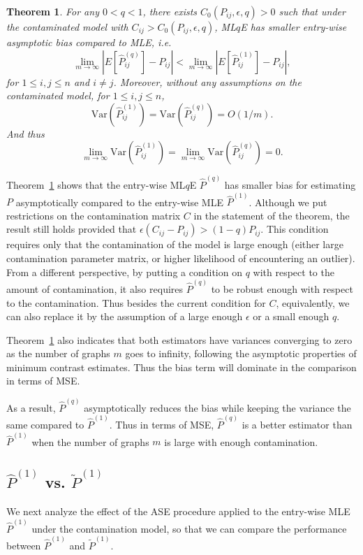 \documentclass[a4paper]{article}
\newtheorem{theorem}[fact]{Theorem}
\renewcommand{\hat}{\widehat}
\begin{document}
\begin{theorem}
\label{thm:MLEvsMLqE}
For any $0 < q < 1$, there exists $C_0(P_{ij}, \epsilon, q) > 0$ such that under the contaminated model with $C_{ij} > C_0(P_{ij}, \epsilon, q)$, ML$q$E has smaller entry-wise asymptotic bias compared to MLE, i.e.\
\[
	\lim_{m \to \infty} \left| E[\hat{P}^{(q)}_{ij}] - P_{ij} \right| < 
    \lim_{m \to \infty} \left| E[\hat{P}^{(1)}_{ij}] - P_{ij} \right|,
\]
for $1 \le i, j \le n$ and $i \ne j$.
Moreover, without any assumptions on the contaminated model, for $1 \le i, j \le n$, 
\[
	\mathrm{Var}(\hat{P}^{(1)}_{ij})
    = \mathrm{Var}(\hat{P}^{(q)}_{ij}) = O(1/m).
\]
And thus
\[
	\lim_{m \to \infty} \mathrm{Var}(\hat{P}^{(1)}_{ij})
    = \lim_{m \to \infty} \mathrm{Var}(\hat{P}^{(q)}_{ij}) = 0.
\]
\end{theorem}

Theorem~\ref{thm:MLEvsMLqE} shows that the entry-wise ML$q$E $\hat{P}^{(q)}$ has smaller bias for estimating $P$ asymptotically compared to the entry-wise MLE $\hat{P}^{(1)}$. Although we put restrictions on the contamination matrix $C$ in the statement of the theorem, the result still holds provided that $\epsilon (C_{ij} - P_{ij}) > (1 - q) P_{ij}$. This condition requires only that the contamination of the model is large enough (either large contamination parameter matrix, or higher likelihood of encountering an outlier). From a different perspective, by putting a condition on $q$ with respect to the amount of contamination, it also requires $\hat{P}^{(q)}$ to be robust enough with respect to the contamination. Thus besides the current condition for $C$, equivalently, we can also replace it by the assumption of a large enough $\epsilon$ or a small enough $q$.

Theorem~\ref{thm:MLEvsMLqE} also indicates that both estimators have variances converging to zero as the number of graphs $m$ goes to infinity, following the asymptotic properties of minimum contrast estimates. Thus the bias term will dominate in the comparison in terms of MSE.

As a result, $\hat{P}^{(q)}$ asymptotically reduces the bias while keeping the variance the same compared to $\hat{P}^{(1)}$. Thus in terms of MSE, $\hat{P}^{(q)}$ is a better estimator than $\hat{P}^{(1)}$ when the number of graphs $m$ is large with enough contamination.

\subsection{$\hat{P}^{(1)}$ vs. $\widetilde{P}^{(1)}$}
We next analyze the effect of the ASE procedure applied to the entry-wise MLE $\hat{P}^{(1)}$ under the contamination model, so that we can compare the performance between $\hat{P}^{(1)}$ and $\widetilde{P}^{(1)}$.
\end{document}
